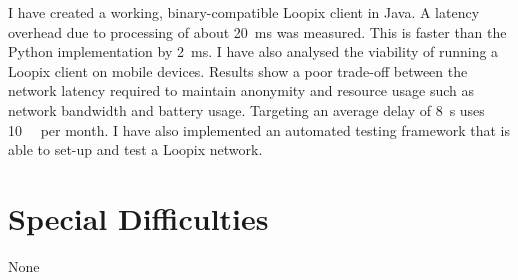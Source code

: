 \documentclass[final,dissertation.tex]{subfiles}
\begin{document}

I have created a working, binary-compatible Loopix client in Java. A latency overhead due to processing of about \SI{20}{\milli\second} was measured. This is faster than the Python implementation by \SI{2}{\milli\second}. I have also analysed the viability of running a Loopix client on mobile devices. Results show a poor trade-off between the network latency required to maintain anonymity and resource usage such as network bandwidth and battery usage. Targeting an average delay of \SI{8}{\second} uses \SI{10}{\gibi\byte} per month. I have also implemented an automated testing framework that is able to set-up and test a Loopix network.

\section*{Special Difficulties}

None
\end{document}
